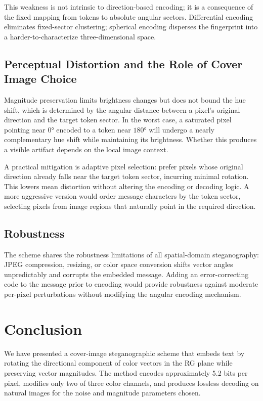 \documentclass[12pt]{article}
\begin{document}
This weakness is not intrinsic to direction-based encoding; it is a
consequence of the fixed mapping from tokens to absolute angular sectors.
Differential encoding eliminates fixed-sector clustering; spherical encoding
disperses the fingerprint into a harder-to-characterize three-dimensional
space.

\subsection{Perceptual Distortion and the Role of Cover Image Choice}

Magnitude preservation limits brightness changes but does not bound the hue
shift, which is determined by the angular distance between a pixel's
original direction and the target token sector. In the worst case, a
saturated pixel pointing near $0°$ encoded to a token near $180°$ will
undergo a nearly complementary hue shift while maintaining its brightness.
Whether this produces a visible artifact depends on the local image context.

A practical mitigation is adaptive pixel selection: prefer pixels whose
original direction already falls near the target token sector, incurring
minimal rotation. This lowers mean distortion without altering the encoding
or decoding logic. A more aggressive version would order message characters
by the token sector, selecting pixels from image regions that naturally point
in the required direction.

\subsection{Robustness}

The scheme shares the robustness limitations of all spatial-domain
steganography: JPEG compression, resizing, or color space conversion shifts
vector angles unpredictably and corrupts the embedded message. Adding an
error-correcting code to the message prior to encoding would provide
robustness against moderate per-pixel perturbations without modifying the
angular encoding mechanism.

\section{Conclusion}
\label{sec:conclusion}

We have presented a cover-image steganographic scheme that embeds text by
rotating the directional component of color vectors in the RG plane while
preserving vector magnitudes. The method encodes approximately 5.2 bits per
pixel, modifies only two of three color channels, and produces lossless
decoding on natural images for the noise and magnitude parameters chosen.
\end{document}

